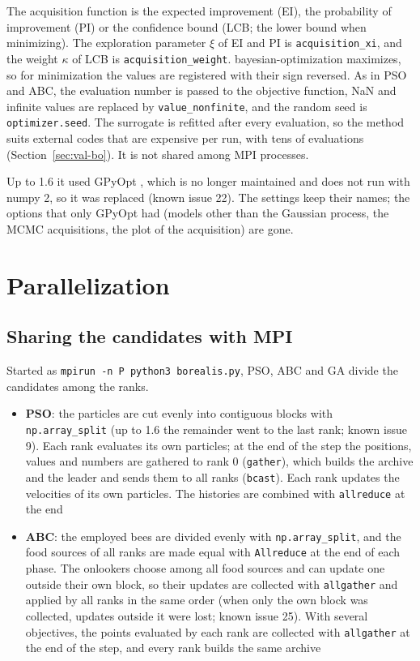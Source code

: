 \documentclass[11pt,a4paper]{article}
\begin{document}
The acquisition function is the expected improvement (EI), the probability of improvement (PI) or the confidence bound (LCB; the lower bound when minimizing). The exploration parameter $\xi$ of EI and PI is \texttt{acquisition\_xi}, and the weight $\kappa$ of LCB is \texttt{acquisition\_weight}. bayesian-optimization maximizes, so for minimization the values are registered with their sign reversed. As in PSO and ABC, the evaluation number is passed to the objective function, NaN and infinite values are replaced by \texttt{value\_nonfinite}, and the random seed is \texttt{optimizer.seed}. The surrogate is refitted after every evaluation, so the method suits external codes that are expensive per run, with tens of evaluations (Section~\ref{sec:val-bo}). It is not shared among MPI processes.

Up to 1.6 it used GPyOpt \cite{gpyopt2016}, which is no longer maintained and does not run with numpy 2, so it was replaced (known issue 22). The settings keep their names; the options that only GPyOpt had (models other than the Gaussian process, the MCMC acquisitions, the plot of the acquisition) are gone.

\section{Parallelization}\label{sec:parallel}

\subsection{Sharing the candidates with MPI}

Started as \texttt{mpirun -n P python3 borealis.py}, PSO, ABC and GA divide the candidates among the ranks.

\begin{itemize}
\item \textbf{PSO}: the particles are cut evenly into contiguous blocks with \texttt{np.array\_split} (up to 1.6 the remainder went to the last rank; known issue 9). Each rank evaluates its own particles; at the end of the step the positions, values and numbers are gathered to rank 0 (\texttt{gather}), which builds the archive and the leader and sends them to all ranks (\texttt{bcast}). Each rank updates the velocities of its own particles. The histories are combined with \texttt{allreduce} at the end
\item \textbf{ABC}: the employed bees are divided evenly with \texttt{np.array\_split}, and the food sources of all ranks are made equal with \texttt{Allreduce} at the end of each phase. The onlookers choose among all food sources and can update one outside their own block, so their updates are collected with \texttt{allgather} and applied by all ranks in the same order (when only the own block was collected, updates outside it were lost; known issue 25). With several objectives, the points evaluated by each rank are collected with \texttt{allgather} at the end of the step, and every rank builds the same archive
\end{itemize}
\end{document}
